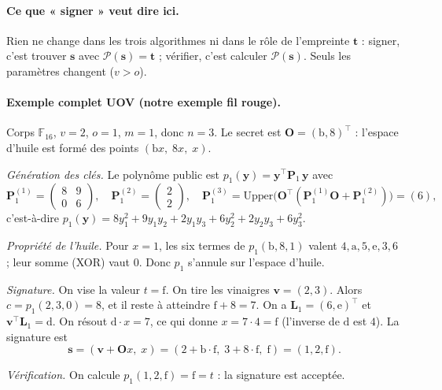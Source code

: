 \paragraph{Ce que « signer » veut dire ici.} Rien ne change dans les trois algorithmes ni dans le rôle de l'empreinte $\mathbf{t}$ : signer, c'est trouver $\mathbf{s}$ avec $\mathcal{P}(\mathbf{s})=\mathbf{t}$ ; vérifier, c'est calculer $\mathcal{P}(\mathbf{s})$. Seuls les paramètres changent ($v>o$).

\paragraph{Exemple complet UOV (notre exemple fil rouge).}\label{sec:fil} Corps $\mathbb{F}_{16}$, $v=2$, $o=1$, $m=1$, donc $n=3$. Le secret est $\mathbf{O}=(\mathrm{b},8)^{\top}$ : l'espace d'huile est formé des points $(\mathrm{b}x,\;8x,\;x)$.

\emph{Génération des clés.} Le polynôme public est $p_1(\mathbf{y})=\mathbf{y}^{\top}\mathbf{P}_1\,\mathbf{y}$ avec
\[\mathbf{P}^{(1)}_1=\begin{pmatrix}8&9\\0&6\end{pmatrix},\quad \mathbf{P}^{(2)}_1=\begin{pmatrix}2\\2\end{pmatrix},\quad \mathbf{P}^{(3)}_1=\mathrm{Upper}\bigl(\mathbf{O}^{\top}(\mathbf{P}^{(1)}_1\mathbf{O}+\mathbf{P}^{(2)}_1)\bigr)=(6),\]
c'est-à-dire $p_1(\mathbf{y})=8y_1^2+9y_1y_2+2y_1y_3+6y_2^2+2y_2y_3+6y_3^2$.

\emph{Propriété de l'huile.} Pour $x=1$, les six termes de $p_1(\mathrm{b},8,1)$ valent $4,\mathrm{a},5,\mathrm{e},3,6$ ; leur somme (XOR) vaut $0$. Donc $p_1$ s'annule sur l'espace d'huile.

\emph{Signature.} On vise la valeur $t=\mathrm{f}$. On tire les vinaigres $\mathbf{v}=(2,3)$. Alors $c=p_1(2,3,0)=8$, et il reste à atteindre $\mathrm{f}+8=7$. On a $\mathbf{L}_1=(6,\mathrm{e})^{\top}$ et $\mathbf{v}^{\top}\mathbf{L}_1=\mathrm{d}$. On résout $\mathrm{d}\cdot x=7$, ce qui donne $x=7\cdot4=\mathrm{f}$ (l'inverse de $\mathrm{d}$ est $4$). La signature est
\[\mathbf{s}=(\mathbf{v}+\mathbf{O}x,\;x)=(2+\mathrm{b}\cdot\mathrm{f},\;3+8\cdot\mathrm{f},\;\mathrm{f})=(1,2,\mathrm{f}).\]

\emph{Vérification.} On calcule $p_1(1,2,\mathrm{f})=\mathrm{f}=t$ : la signature est acceptée.


